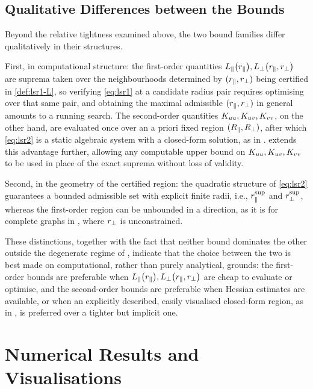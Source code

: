 \documentclass[a4paper]{cas-dc}
\begin{document}
\subsection{Qualitative Differences between the Bounds}
\label{ssec:qualitative}

Beyond the relative tightness examined above, the two bound families differ qualitatively in their structures.

First, in computational structure: the first-order quantities \(L_{\parallel}\bigl(r_{\parallel}\bigr),L_{\perp}\bigl(r_{\parallel},r_{\perp}\bigr)\) are suprema taken over the neighbourhoods determined by \((r_{\parallel},r_{\perp})\) being certified in \eqref{def:lsr1-L}, so verifying \eqref{eq:lsr1} at a candidate radius pair requires optimising over that same pair, and obtaining the maximal admissible \((r_{\parallel},r_{\perp})\) in general amounts to a running search. The second-order quantities \(K_{uu},K_{uv},K_{vv}\), on the other hand, are evaluated once over an a priori fixed region \((R_{\parallel},R_{\perp})\), after which \eqref{eq:lsr2} is a static algebraic system with a closed-form solution, as in .  extends this advantage further, allowing any computable upper bound on \(K_{uu},K_{uv},K_{vv}\) to be used in place of the exact suprema without loss of validity. %

Second, in the geometry of the certified region: the quadratic structure of \eqref{eq:lsr2} guarantees a bounded admissible set with explicit finite radii, i.e., \(r_{\parallel}^{\sup}\) and \(r_{\perp}^{\sup}\), whereas the first-order region can be unbounded in a direction, as it is for complete graphs in , where \(r_{\perp}\) is unconstrained.

These distinctions, together with the fact that neither bound dominates the other outside the degenerate regime of , indicate that the choice between the two is best made on computational, rather than purely analytical, grounds: the first-order bounds are preferable when \(L_{\parallel}\bigl(r_{\parallel}\bigr),L_{\perp}\bigl(r_{\parallel},r_{\perp}\bigr)\) are cheap to evaluate or optimise, and the second-order bounds are preferable when Hessian estimates are available, or when an explicitly described, easily visualised closed-form region, as in , is preferred over a tighter but implicit one.



\section{Numerical Results and Visualisations}
\label{sec:numerics}
\end{document}
